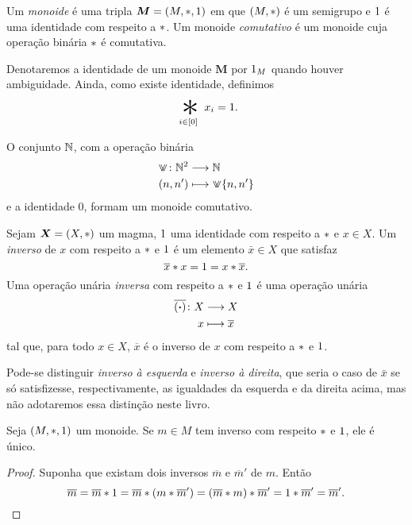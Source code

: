 \begin{definition}
Um \emph{monoide} é uma tripla $\bm M=(M,\ast,1)$ em que $(M,\ast)$ é um semigrupo e $1$ é uma identidade com respeito a $\ast$. Um monoide \emph{comutativo} é um monoide cuja operação binária $\ast$ é comutativa.
\end{definition}

\begin{notation}
Denotaremos a identidade de um monoide $\bm M$ por $1_M$ quando houver ambiguidade. Ainda, como existe identidade, definimos
	\begin{equation*}
	\bigopb_{i \in [0]} x_i = \id.
	\end{equation*}
\end{notation}

\begin{example}
O conjunto $\mathbb{N}$, com a operação binária
	\begin{align*}
	\func{\max}{\N^2}{\N}{(n,n')}{\max\{n,n'\}}
	\end{align*}
e a identidade $0$, formam um monoide comutativo.
\end{example}

\begin{definition}[Inverso]
Sejam $\bm X = (X, \ast )$ um magma, $1$ uma identidade com respeito a $\ast$ e $x \in X$. Um \emph{inverso} de $x$ com respeito a $\ast$ e $1$ é um elemento $\bar x \in X$ que satisfaz
	\begin{equation*}
	\overline x \ast x = 1 =  x \ast \overline x.
	\end{equation*}
Uma operação unária \emph{inversa} com respeito a $\ast$ e $1$ é uma operação unária
	\begin{align*}
	{\overline{(\bm{\cdot})}}\colon {X} &\longrightarrow {X} \\{x} &\longmapsto \overline{x}
	\end{align*}
tal que, para todo $x \in X$, $\overline{x}$ é o inverso de $x$ com respeito a $\ast$ e $1$.
\end{definition}

Pode-se distinguir \emph{inverso à esquerda} e \emph{inverso à direita}, que seria o caso de $\bar x$ se só satisfizesse, respectivamente, as igualdades da esquerda e da direita acima, mas não adotaremos essa distinção neste livro.

\begin{proposition}
\label{prop:unic.inv}
Seja $(M,\ast,1)$ um monoide. Se $m \in M$ tem inverso com respeito $\ast$ e $1$, ele é único.
\end{proposition}
\begin{proof}
Suponha que existam dois inversos $\overline m$ e $\overline{m}'$ de $m$. Então
	\begin{equation*}
	\overline{m} = \overline{m} \ast 1 = \overline m \ast (m \ast \overline{m}') = (\overline m \ast m) \ast \overline{m}' = 1 \ast \overline{m}' = \overline{m}'. \qedhere
	\end{equation*}
\end{proof}


